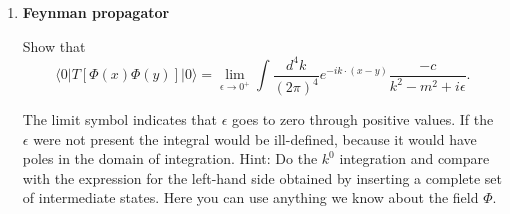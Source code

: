 \documentclass[12pt]{article}
\begin{document}
\begin{enumerate}
 \vspace*{0.5cm}

\item {\bf Feynman propagator}

Show that 
\[ \langle 0| T[\Phi(x)\Phi(y) ]|0\rangle = \lim_{\epsilon\to 0^+} \int \frac{d^4k}{(2\pi)^4} e^{-ik\cdot (x-y)} \frac{-c}{k^2-m^2+i\epsilon}.\]

The limit symbol indicates that $\epsilon$ goes to zero through positive values. If the $\epsilon$ were not present the integral would be ill-defined, because it would have poles in the domain of integration. Hint: Do the $k^0$ integration and compare with the expression for the left-hand side obtained by inserting a complete set of intermediate states. Here you can use anything we know about the field $\Phi$.
  
\end{enumerate}
\end{document}
